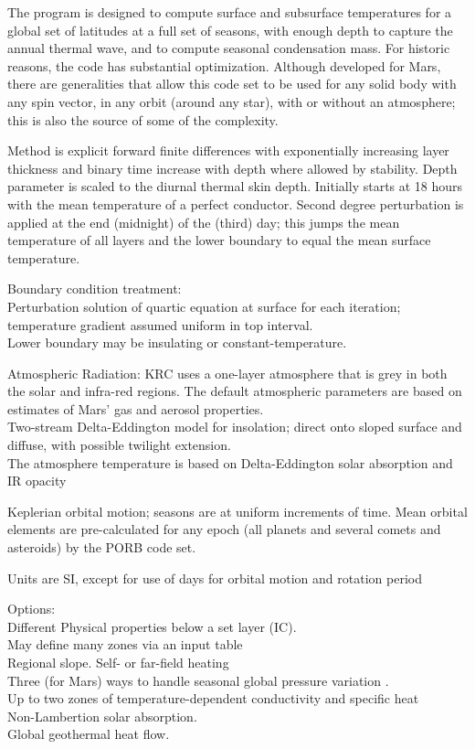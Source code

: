 \documentclass{article}
\newcommand{\qi}{\\ \hspace*{2.em}}      %
\newcommand{\qii}{\\ \hspace*{4.em}}     %
\begin{document}
The program is designed to compute surface and subsurface temperatures for a
global set of latitudes at a full set of seasons, with enough depth to capture
the annual thermal wave, and to compute seasonal condensation mass. For historic
reasons, the code has substantial optimization. Although developed for Mars,
there are generalities that allow this code set to be used for any solid body
with any spin vector, in any orbit (around any star), with or without an
atmosphere; this is also the source of some of the complexity.
 
Method is explicit forward finite differences with exponentially increasing
layer thickness and binary time increase with depth where allowed by stability.
Depth parameter is scaled to the diurnal thermal skin depth.  Initially starts
at 18 hours with the mean temperature of a perfect conductor.  Second degree
perturbation is applied at the end (midnight) of the (third) day; this jumps the
mean temperature of all layers and the lower boundary to equal the mean surface
temperature.

Boundary condition treatment:
\qi  Perturbation solution of quartic equation at surface for each iteration;
    temperature gradient assumed uniform in top interval.
\qi  Lower boundary may be insulating or constant-temperature.

Atmospheric Radiation: KRC uses a one-layer atmosphere that is grey in both the
solar and infra-red regions. The default atmospheric
parameters are based on estimates of Mars' gas and aerosol properties.
\qi  Two-stream Delta-Eddington model for insolation; direct onto sloped surface 
and diffuse, with possible twilight extension.
\\ The atmosphere temperature is based on Delta-Eddington solar absorption and IR opacity

Keplerian orbital motion; seasons are at uniform increments of time. Mean 
orbital elements are pre-calculated for any epoch (all planets and several
comets and asteroids) by the PORB code set.

Units are SI, except for use of days for orbital motion and rotation period 

Options:
\qi  Different Physical properties below a set layer (IC). 
\qii May define many zones via an input table
\qi  Regional slope. Self- or far-field heating
\qi  Three (for Mars) ways to handle seasonal global pressure variation .
\qi  Up to two zones of temperature-dependent conductivity and specific heat
\qi Non-Lambertion solar absorption.
\qi Global geothermal heat flow.
\end{document}
